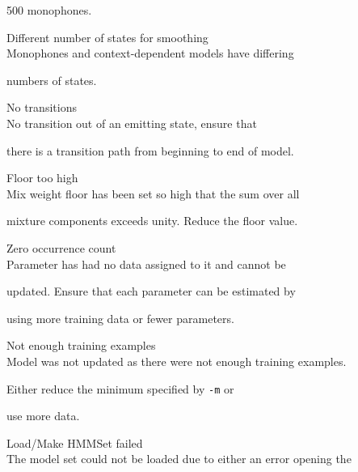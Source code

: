\begin{itemize}
\begin{itemize}
        500 monophones.





    Different number of states for smoothing\\


        Monophones and context-dependent models have differing


        numbers of states.





    No transitions\\


        No transition out of an emitting state, ensure that


        there is a transition path from beginning to end of model.





    Floor too high\\


        Mix weight floor has been set so high that the sum over all 


        mixture components exceeds unity.  Reduce the floor value.





    Zero occurrence count\\


        Parameter has had no data assigned to it and cannot be


        updated.  Ensure that each parameter can be estimated by


        using more training data or fewer parameters.





    Not enough training examples\\


        Model was not updated as there were not enough training examples.


        Either reduce the minimum specified by \texttt{-m} or


        use more data.





    Load/Make HMMSet failed\\


        The model set could not be loaded due to either an error opening the



\end{itemize}
\end{itemize}
